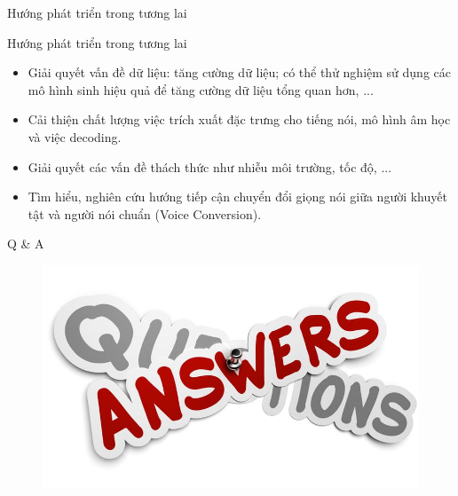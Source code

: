 \documentclass[10pt,a4paper,openany]{beamer}
\begin{document}
	\begin{frame}{Hướng phát triển trong tương lai}
		\begin{block}{Hướng phát triển trong tương lai}  \pause
			\begin{itemize}
				\item Giải quyết vấn đề dữ liệu: tăng cường dữ liệu; có thể thử nghiệm sử dụng các mô hình sinh hiệu quả để tăng cường dữ liệu tổng quan hơn, ...  \pause
				\item Cải thiện chất lượng việc trích xuất đặc trưng cho tiếng nói, mô hình âm học và việc decoding.   \pause
				\item Giải quyết các vấn đề thách thức như nhiễu môi trường, tốc độ, ...  \pause
				\item Tìm hiểu, nghiên cứu hướng tiếp cận chuyển đổi giọng nói giữa người khuyết tật và người nói chuẩn (Voice Conversion).
			\end{itemize}
		\end{block}
	\end{frame}

	\begin{frame}
	\end{frame}

	\begin{frame}{Q \& A}
		\begin{center}
			\begin{figure}[htbp]
				\begin{center}
					\includegraphics[width=0.75\linewidth]{charts/question-answer-problem.jpg}		
				\end{center}
				\label{fig_question_answer_problem}
			\end{figure}
		\end{center}
	\end{frame}

	
\end{document}
